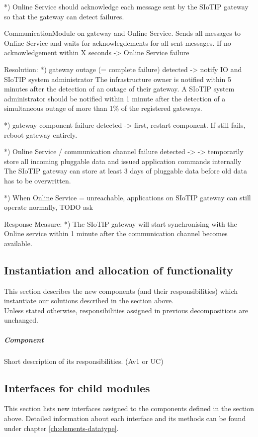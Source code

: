        *) Online Service should acknowledge each message sent by the SIoTIP
           gateway so that the gateway can detect failures.

           CommunicationModule on gateway and Online Service.
           Sends all messages to Online Service and waits for
           acknowlegdements for all sent messages. If no acknowledgement
           within X seconds -> Online Service failure

    Resolution:
        *) gateway outage (= complete failure) detected
           -> notify IO and SIoTIP system administrator
           The infrastructure owner is notified within 5 minutes after
           the detection of an outage of their gateway. A SIoTIP system administrator
           should be notified within 1 minute after the detection of a simultaneous
           outage of more than 1\% of the registered gateways.

        *) gateway component failure detected
           -> first, restart component. If still fails, reboot gateway entirely.

        *) Online Service / communication channel failure detected ->
           -> temporarily store all incoming pluggable data and issued
              application commands internally
           The SIoTIP gateway can store at least 3 days of pluggable data before
           old data has to be overwritten.

        *) When Online Service = unreachable, applications on SIoTIP gateway
           can still operate normally, TODO ask

    Response Measure:
        *) The SIoTIP gateway will start synchronising with the Online service
           within 1 minute after the communication channel becomes available.


\subsection{Instantiation and allocation of functionality}
    This section describes the new components (and their responsibilities)
    which instantiate our solutions described in the section above. \\
    Unless stated otherwise, responsibilities assigned in previous decompositions are unchanged.

    \subparagraph{Component}
        Short description of its responsibilities. (Av1 or UC)


\subsection{Interfaces for child modules}
    This section lists new interfaces assigned to the components defined
    in the section above. Detailed information about each interface and
    its methods can be found under chapter \ref{ch:elements-datatype}. \\

